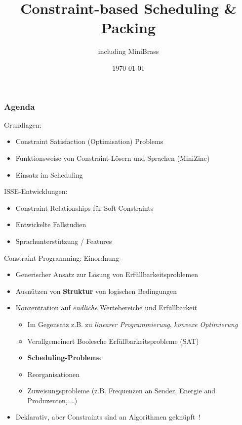 \documentclass[handout,10pt,xcolor={dvipsnames},fleqn]{beamer}
\title{Constraint-based Scheduling \& Packing}
\author{including MiniBrass}
\date{\today}
\begin{document}
\titleframe

\begin{frame}
    \frametitle{Agenda}
 \alert{Grundlagen:}
    \begin{itemize}
    \item Constraint Satisfaction (Optimisation) Problems
    \item Funktionsweise von Constraint-Lösern und Sprachen (MiniZinc)
    \item Einsatz im Scheduling
    \end{itemize}

    \vspace*{3ex}
    
\alert{ISSE-Entwicklungen:}
    \begin{itemize} 
    \item Constraint Relationships für Soft Constraints
    \item Entwickelte Fallstudien
    \item Sprachunterstützung / Features
     \end{itemize}
\end{frame}
\graphicspath{{img/}}

\begin{frame}{Constraint Programming: Einordnung}	
\begin{itemize}
\item Generischer Ansatz zur Lösung von \alert{Erfüllbarkeitsproblemen} 
\item Ausnützen von \textbf{Struktur} von logischen Bedingungen~\cite{tsang1993foundations}
\item Konzentration auf \emph{endliche} Wertebereiche und Erfüllbarkeit~\cite[Kap.~5]{russell2010artificial} \pause
\begin{itemize}
\item Im Gegensatz z.B. zu \emph{linearer Programmierung}, \emph{konvexe Optimierung}
\item Verallgemeinert Boolesche Erfüllbarkeitsprobleme (SAT)
\item \textbf{Scheduling-Probleme}
\item Reorganisationen
\item Zuweisungsprobleme (z.B. Frequenzen an Sender, Energie and Produzenten, \ldots)
\end{itemize} \pause
\item Deklarativ, aber Constraints sind an Algorithmen geknüpft~\cite{Rossi2006}! 
\end{itemize}
\end{frame}
\end{document}
